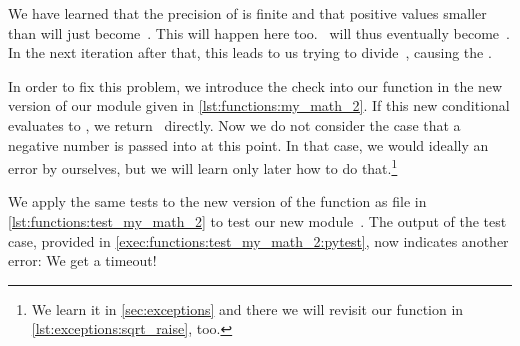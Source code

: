 We have learned that the precision of  is finite and that positive values smaller than  will just become~.
This will happen here too.
~will thus eventually become~.
In the next iteration after that, this leads to us trying to divide~, causing the .
%
\FloatBarrier%
%
%
%
%
%
%
%

In order to fix this problem, we introduce the check  into our  function in the new version  of our module given in \cref{lst:functions:my_math_2}.
If this new conditional evaluates to , we return~ directly.
Now we do not consider the case that a negative number is passed into  at this point.
In that case, we would ideally  an error by ourselves, but we will learn only later how to do that.\footnote{%
We learn it in \cref{sec:exceptions} and there we will revisit our  function in \cref{lst:exceptions:sqrt_raise}, too.}

We apply the same tests to the new version of the  function as file  in \cref{lst:functions:test_my_math_2} to test our new module~.
The output of the test case, provided in \cref{exec:functions:test_my_math_2:pytest}, now indicates another error:
We get a timeout!

